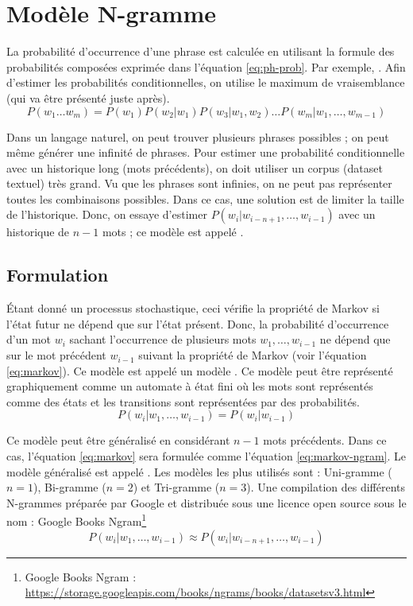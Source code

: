\documentclass{KodeBook}
\begin{document}
\section{Modèle N-gramme}

La probabilité d'occurrence d'une phrase est calculée en utilisant la formule des probabilités composées exprimée dans l'équation \ref{eq:ph-prob}.
Par exemple, .
Afin d'estimer les probabilités conditionnelles, on utilise le maximum de vraisemblance (qui va être présenté juste après).
\begin{equation}\label{eq:ph-prob}
	P(w_1 \ldots w_m) =  P(w_1) P(w_2 | w_1) P(w_3 | w_1, w_2) \ldots P(w_m | w_1, \ldots, w_{m-1})
\end{equation}

Dans un langage naturel, on peut trouver plusieurs phrases possibles ; on peut même générer une infinité de phrases.
Pour estimer une probabilité conditionnelle avec un historique long (mots précédents), on doit utiliser un corpus (dataset textuel) très grand. 
Vu que les phrases sont infinies, on ne peut pas représenter toutes les combinaisons possibles. 
Dans ce cas, une solution est de limiter la taille de l'historique. 
Donc, on essaye d'estimer $P(w_i|w_{i-n+1},\ldots,w_{i-1})$ avec un historique de $n-1$ mots ; 
ce modèle est appelé .

\subsection{Formulation}

Étant donné un processus stochastique, ceci vérifie la propriété de Markov si l'état futur ne dépend que sur l'état présent. 
Donc, la probabilité d'occurrence d'un mot $w_i$ sachant l'occurrence de plusieurs mots $w_1, \ldots, w_{i-1}$ ne dépend que sur le mot précédent $w_{i-1}$ suivant la propriété de Markov (voir l'équation \ref{eq:markov}). 
Ce modèle est appelé un modèle .
Ce modèle peut être représenté graphiquement comme un automate à état fini où les mots sont représentés comme des états et les transitions sont représentées par des probabilités.
\begin{equation}
	P(w_i | w_1,\ldots, w_{i-1}) = P(w_i | w_{i-1})
	\label{eq:markov}
\end{equation}

Ce modèle peut être généralisé en considérant $n-1$ mots précédents. 
Dans ce cas, l'équation \ref{eq:markov} sera formulée comme l'équation \ref{eq:markov-ngram}.
Le modèle généralisé est appelé .
Les modèles les plus utilisés sont : Uni-gramme ($n=1$), Bi-gramme ($n=2$) et Tri-gramme ($n=3$).
Une compilation des différents N-grammes préparée par Google et distribuée sous une licence open source sous le nom : Google Books Ngram\footnote{Google Books Ngram : \url{https://storage.googleapis.com/books/ngrams/books/datasetsv3.html}}
\begin{equation}
	P(w_i | w_1,\ldots, w_{i-1}) \approx P(w_i | w_{i-n+1}, \ldots, w_{i-1})
	\label{eq:markov-ngram}
\end{equation}
\end{document}
